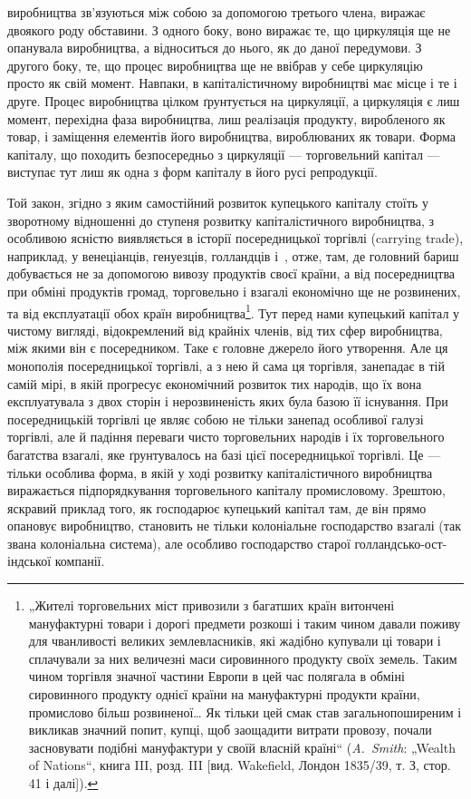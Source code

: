 \parcont{}  %
виробництва зв’язуються між собою за допомогою третього члена,
виражає двоякого роду обставини. З одного боку, воно виражає
те, що циркуляція ще не опанувала виробництва, а відноситься до
нього, як до даної передумови. З другого боку, те, що процес
виробництва ще не ввібрав у себе циркуляцію просто як свій
момент. Навпаки, в капіталістичному виробництві має місце і те
і друге. Процес виробництва цілком ґрунтується на циркуляції, а
циркуляція є лиш момент, перехідна фаза виробництва, лиш реалізація
продукту, виробленого як товар, і заміщення елементів
його виробництва, вироблюваних як товари. Форма капіталу, що
походить безпосередньо з циркуляції — торговельний капітал —
виступає тут лиш як одна з форм капіталу в його русі репродукції.

Той закон, згідно з яким самостійний розвиток купецького капіталу
стоїть у зворотному відношенні до ступеня розвитку капіталістичного
виробництва, з особливою ясністю виявляється в історії
посередницької торгівлі (carrying trade), наприклад, у венеціанців,
генуезців, голландців і~, отже, там, де головний бариш
добувається не за допомогою вивозу продуктів своєї країни,
а від посередництва при обміні продуктів громад, торговельно
і взагалі економічно ще не розвинених, та від експлуатації обох
країн виробництва\footnote{
„Жителі торговельних міст привозили з багатших країн витончені мануфактурні
товари і дорогі предмети розкоші і таким чином давали поживу для
чванливості великих землевласників, які жадібно купували ці товари і сплачували
за них величезні маси сировинного продукту своїх земель. Таким чином торгівля
значної частини Европи в цей час полягала в обміні сировинного продукту
однієї країни на мануфактурні продукти країни, промислово більш розвиненої\dots{}
Як тільки цей смак став загальнопоширеним і викликав значний попит, купці,
щоб заощадити витрати провозу, почали засновувати подібні мануфактури
у своїй власній країні“ (\emph{A.~Smith}: „Wealth of Nations“, книга III, розд. III [вид.
Wakefield, Лондон 1835/39, т. З, стор. 41 і далі]).
}. Тут перед нами купецький капітал у чистому
вигляді, відокремлений від крайніх членів, від тих сфер
виробництва, між якими він є посередником. Таке є головне
джерело його утворення. Але ця монополія посередницької торгівлі,
а з нею й сама ця торгівля, занепадає в тій самій мірі,
в якій прогресує економічний розвиток тих народів, що їх вона
експлуатувала з двох сторін і нерозвиненість яких була базою
її існування. При посередницькій торгівлі це являє собою не
тільки занепад особливої галузі торгівлі, але й падіння переваги
чисто торговельних народів і їх торговельного багатства
взагалі, яке ґрунтувалось на базі цієї посередницької торгівлі.
Це — тільки особлива форма, в якій у ході розвитку капіталістичного
виробництва виражається підпорядкування торговельного
капіталу промисловому. Зрештою, яскравий приклад
того, як господарює купецький капітал там, де він прямо опановує
виробництво, становить не тільки колоніальне господарство
взагалі (так звана колоніальна система), але особливо господарство
старої голландсько-ост-індської компанії.
